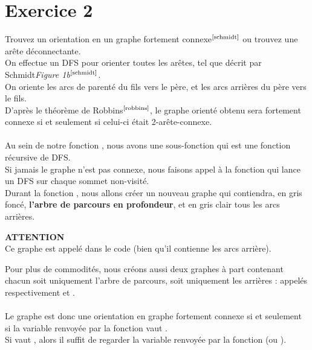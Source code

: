 \documentclass{article}      %
\begin{document}
\section{Exercice 2}
\textcolor{exogris}{
Trouvez un orientation en un graphe fortement connexe$^\text{\cite{schmidt}}$ ou trouvez une arête déconnectante.
}
\\On effectue un DFS pour orienter toutes les arêtes, tel que décrit par Schmidt\textit{Figure 1b}$^\text{\cite{schmidt}}$.
\\On oriente les arcs de parenté du fils vers le père, et les arcs arrières du père vers le fils.
\\D'après le théorème de Robbins$^\text{\cite{robbins}}$, le graphe orienté obtenu sera fortement connexe si et seulement si celui-ci était 2-arête-connexe.
\\\\Au sein de notre fonction , nous avons une sous-fonction  qui est une fonction récursive de DFS.
\\Si jamais le graphe n'est pas connexe, nous faisons appel à la fonction  qui lance un DFS sur chaque sommet non-visité.
\\Durant la fonction , nous allons créer un nouveau graphe qui contiendra, en \textcolor[HTML]{333333}{gris foncé}, \textbf{l'arbre de parcours en profondeur}, et en \textcolor[HTML]{a0a0a0}{gris clair} tous les arcs arrières.
\begin{danger}
{ \scriptsize \textcolor{danger}{ \textbf{ATTENTION}}}
\vspace{3px}
\\ Ce graphe est appelé  dans le code (bien qu'il contienne les arcs arrière).
\end{danger}
Pour plus de commodités, nous créons aussi deux graphes à part contenant chacun soit uniquement l'arbre de parcours, soit uniquement les arrières : appelés respectivement  et .
\\\\Le graphe  est donc une orientation en graphe fortement connexe si et seulement si la variable  renvoyée par la fonction vaut .
\\Si {} vaut , alors il suffit de regarder la variable  renvoyée par la fonction (ou ).
\end{document}
